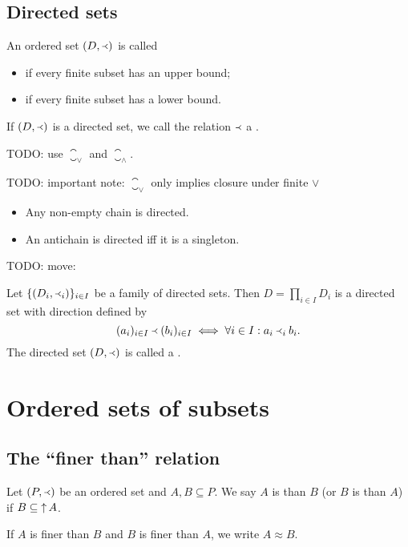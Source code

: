 \subsection{Directed sets}
\begin{definition}
An ordered set $(D,\Yleft)$ is called
\begin{itemize}
\item {} if every finite subset has an upper bound;
\item {} if every finite subset has a lower bound.
\end{itemize}
If $(D,\Yleft)$ is a directed set, we call the relation $\Yleft$ a .
\end{definition}
TODO: use $\closure_\vee$ and $\closure_\wedge$.

TODO: important note: $\closure_\vee$ only implies closure under finite $\vee$

\begin{example}
\begin{itemize}
\item Any non-empty chain is directed.
\item An antichain is directed iff it is a singleton.
\end{itemize}
\end{example}

TODO: move:
\begin{proposition}
Let $\{(D_i,\Yleft_i)\}_{i\in I}$ be a family of directed sets. Then $D= \prod_{i\in I}D_i$ is a directed set with direction defined by
\[ (a_i)_{i\in I} \Yleft (b_i)_{i\in I} \iff \forall i\in I: a_i\Yleft_i b_i. \]
The directed set $(D,\Yleft)$ is called a .
\end{proposition}


\section{Ordered sets of subsets}
\subsection{The ``finer than'' relation}
\begin{definition}
Let $\left( P,\Yleft \right)$ be an ordered set and $A,B \subseteq P$. We say $A$ is  than $B$ (or $B$ is  than $A$) if $B\subseteq \mathop{\uparrow} A$.

If $A$ is finer than $B$ and $B$ is finer than $A$, we write $A \approx B$.
\end{definition}

